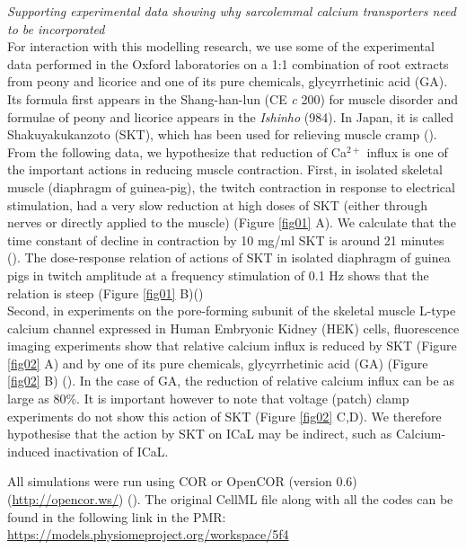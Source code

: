 \documentclass[fleqn,10pt]{physiome}
\begin{document}
\textit{Supporting experimental data showing why sarcolemmal calcium transporters need to be incorporated}\\\newline
For interaction with this modelling research, we use some of the experimental data performed in the Oxford laboratories on a 1:1 combination of root extracts from peony and licorice and one of its pure chemicals, glycyrrhetinic acid (GA). Its formula first appears in the Shang-han-lun (CE \textit{c} 200) for muscle disorder and formulae of peony and licorice appears in the \textit{Ishinho} (984). In Japan, it is called Shakuyakukanzoto (SKT), which has been used for relieving muscle cramp (\citep{hyodo2006immediate}). From the following data, we hypothesize that reduction of Ca$^{2+}$ influx is one of the important actions in reducing muscle contraction. First, in isolated skeletal muscle (diaphragm of guinea-pig), the twitch contraction in response to electrical stimulation, had a very slow reduction at high doses of SKT (either through nerves or directly applied to the muscle) (Figure \ref{fig01} A). We calculate that the time constant of decline in contraction by 10 mg/ml SKT is around 21 minutes (\citep{Sam2015Actions}). The dose-response relation of actions of SKT in isolated diaphragm of guinea pigs in twitch amplitude at a frequency stimulation of 0.1 Hz shows that the relation is steep (Figure \ref{fig01} B)(\citep{Sam2015Actions})\\
Second, in experiments on the pore-forming subunit of the skeletal muscle L-type calcium channel expressed in Human Embryonic Kidney (HEK) cells, fluorescence imaging experiments show that relative calcium influx is reduced by SKT (Figure \ref{fig02} A) and by one of its pure chemicals, glycyrrhetinic acid (GA) (Figure \ref{fig02} B) (\citep{Noble2019Incorporation}). In the case of GA, the reduction of relative calcium influx can be as large as 80\%. It is important however to note that voltage (patch) clamp experiments do not show this action of SKT (Figure \ref{fig02} C,D). We therefore hypothesise that the action by SKT on ICaL may be indirect, such as Calcium-induced inactivation of ICaL.

All simulations were run using COR or OpenCOR (version 0.6) (\url{http://opencor.ws/}) (\citep{Noble2019Incorporation}). 
The original CellML file along with all the codes can be found in the following link in the PMR:\newline
\url{https://models.physiomeproject.org/workspace/5f4}
\end{document}
